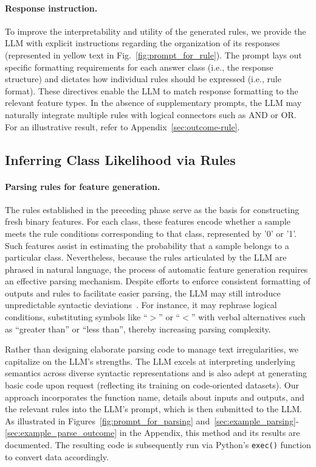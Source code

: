 \vspace*{-0.12in}
\paragraph{Response instruction.} To improve the interpretability and utility of the generated rules, we provide the LLM with explicit instructions regarding the organization of its responses (represented in yellow text in Fig.~\ref{fig:prompt_for_rule}). The prompt lays out specific formatting requirements for each answer class (i.e., the response structure) and dictates how individual rules should be expressed (i.e., rule format). These directives enable the LLM to match response formatting to the relevant feature types. In the absence of supplementary prompts, the LLM may naturally integrate multiple rules with logical connectors such as AND or OR. For an illustrative result, refer to Appendix~\ref{sec:outcome-rule}.

\subsection{Inferring Class Likelihood via Rules}
\label{Sec:training}

\paragraph{Parsing rules for feature generation.} The rules established in the preceding phase serve as the basis for constructing fresh binary features. For each class, these features encode whether a sample meets the rule conditions corresponding to that class, represented by '0' or '1'. Such features assist in estimating the probability that a sample belongs to a particular class. Nevertheless, because the rules articulated by the LLM are phrased in natural language, the process of automatic feature generation requires an effective parsing mechanism. Despite efforts to enforce consistent formatting of outputs and rules to facilitate easier parsing, the LLM may still introduce unpredictable syntactic deviations~\cite{kovavc2023large}. For instance, it may rephrase logical conditions, substituting symbols like ``$>$'' or ``$<$'' with verbal alternatives such as ``greater than'' or ``less than'', thereby increasing parsing complexity. 

Rather than designing elaborate parsing code to manage text irregularities, we capitalize on the LLM's strengths. The LLM excels at interpreting underlying semantics across diverse syntactic representations and is also adept at generating basic code upon request (reflecting its training on code-oriented datasets). Our approach incorporates the function name, details about inputs and outputs, and the relevant rules into the LLM's prompt, which is then submitted to the LLM. As illustrated in Figures~\ref{fig:prompt_for_parsing} and~\ref{sec:example_parsing}-\ref{sec:example_parse_outcome} in the Appendix, this method and its results are documented. The resulting code is subsequently run via Python's \texttt{exec()} function to convert data accordingly.

